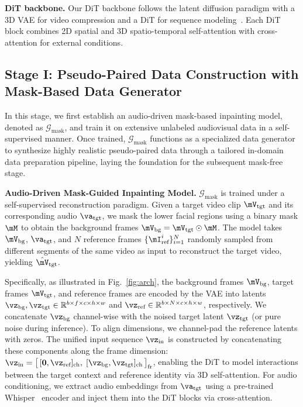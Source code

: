 \documentclass{article}
\newcommand{\myparagraph}[1]{\noindent\textbf{#1}}
\newcommand{\Gmask}{\mathcal{G}_{\text{mask}}}
\theoremstyle{plain}
\theoremstyle{definition}
\theoremstyle{remark}
\begin{document}
\myparagraph{DiT backbone.}
Our DiT backbone follows the latent diffusion paradigm with a 3D VAE for video compression and a DiT for sequence modeling~\citep{peebles2023dit}. Each DiT block combines 2D spatial and 3D spatio-temporal self-attention with cross-attention for external conditions.

\subsection{Stage I: Pseudo-Paired Data Construction with Mask-Based Data Generator}
\label{sec:stage1}
In this stage, we first establish an audio-driven mask-based inpainting model, denoted as $\mathcal{G}_{\text{mask}}$, and train it on extensive unlabeled audiovisual data in a self-supervised manner.
Once trained, $\mathcal{G}_{\text{mask}}$ functions as a specialized data generator to synthesize highly realistic pseudo-paired data through a tailored in-domain data preparation pipeline, laying the foundation for the subsequent mask-free stage.

\myparagraph{Audio-Driven Mask-Guided Inpainting Model.}
$\Gmask$ is trained under a self-supervised reconstruction paradigm.
Given a target video clip $\mV_{\text{tgt}}$ and its corresponding audio $\va_{\text{tgt}}$, we mask the lower facial regions using a binary mask $\mM$ to obtain the background frames $\mV_{\text{bg}} = \mV_{\text{tgt}} \odot \mM$.
The model takes $\mV_{\text{bg}}$, $\va_{\text{tgt}}$, and $N$ reference frames $\{\mI_{\text{ref}}^i\}_{i=1}^N$ randomly sampled from different segments of the same video as input to reconstruct the target video, yielding $\hat{\mV}_{\text{tgt}}$.

Specifically, as illustrated in Fig.~\ref{fig:arch}, the background frames $\mV_{\text{bg}}$, target frames $\mV_{\text{tgt}}$, and reference frames are encoded by the VAE into latents $\vz_{\text{bg}}, \vz_{\text{tgt}} \in \mathbb{R}^{b \times f \times c \times h \times w}$ and $\vz_{\text{ref}} \in \mathbb{R}^{b \times N \times c \times h \times w}$, respectively.
We concatenate $\vz_{\text{bg}}$ channel-wise with the noised target latent $\vz_{\text{tgt}}$ (or pure noise during inference). To align dimensions, we channel-pad the reference latents with zeros.
The unified input sequence $\vz_{\text{in}}$ is constructed by concatenating these components along the frame dimension:
$\vz_{\text{in}} = \big[ \,[\mathbf{0}, \vz_{\text{ref}}]_{\text{ch}},\; [\vz_{\text{bg}}, \vz_{\text{tgt}}]_{\text{ch}} \,\big]_{\text{fr}}$,
enabling the DiT to model interactions between the target context and reference identity via 3D self-attention.
For audio conditioning, we extract audio embeddings from $\va_{\text{tgt}}$ using a pre-trained Whisper~\citep{radford2023whisper} encoder and inject them into the DiT blocks via cross-attention.
\end{document}
